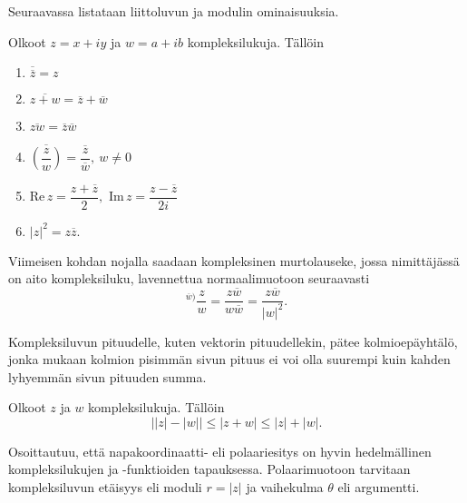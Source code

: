 \documentclass[a4paper, 12pt]{article}
\theoremstyle{remark}
\theoremstyle{definition}
\renewcommand{\bar}[1]{\overline{#1}}
\newcommand{\abs}[1]{\lvert#1\rvert}
\renewcommand{\Re}[1]{\textrm{Re}\, #1}
\renewcommand{\Im}[1]{\textrm{Im}\, #1}
\begin{document}
Seuraavassa listataan liittoluvun ja modulin ominaisuuksia.
\begin{lause}\label{l8} Olkoot $z=x+iy$ ja $w=a+ib$ kompleksilukuja. Tällöin
\begin{enumerate}[label=\roman*), leftmargin=*, topsep=0pt, itemsep=0pt, parsep=0pt, font=\small\bfseries\color{red}]
\item $\bar{\bar{z}}=z$
\item $\bar{z+w}=\bar{z}+\bar{w}$

\item $\bar{zw}=\bar{z}\bar{w}$

\item $\bar{\left( \dfrac{z}{w}\right)}=\dfrac{\bar{z}}{\bar{w}},\ w\neq 0$

\item $\Re z=\dfrac{z+\bar{z}}{2},$ $\Im z=\dfrac{z-\bar{z}}{2i}$

\item $\abs{z}^2=z\bar{z}.$
\end{enumerate}
\end{lause}

Viimeisen kohdan nojalla saadaan kompleksinen murtolauseke, jossa nimittäjässä on aito kompleksiluku, lavennettua normaalimuotoon seuraavasti
$$
^{\bar{w})}\dfrac{z}{w}=\dfrac{z\bar{w}}{w\bar{w}}=\dfrac{z\bar{w}}{\abs{w}^2}.
$$

Kompleksiluvun pituudelle, kuten vektorin pituudellekin, pätee kolmioepäyhtälö, jonka mukaan kolmion pisimmän sivun pituus ei voi olla suurempi kuin kahden lyhyemmän sivun pituuden summa.

\begin{lause}[Kolmioepäyhtälö]
Olkoot $z$ ja $w$ kompleksilukuja. Tällöin
$$
\left\lvert \abs{z}-\abs{w}\right\rvert\leq \left\lvert z+w\right\rvert\leq \abs{z}+\abs{w}.
$$
\end{lause}


Osoittautuu, että napakoordinaatti- eli polaariesitys on hyvin hedelmällinen kompleksilukujen ja -funktioiden tapauksessa. Polaarimuotoon tarvitaan kompleksiluvun etäisyys eli moduli $r=\abs{z}$ ja vaihekulma $\theta$ eli argumentti.
\end{document}
